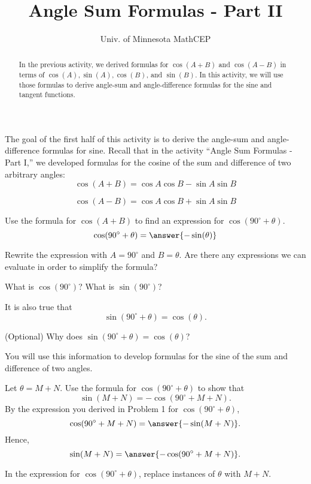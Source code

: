 \documentclass[number]{ximera}
\title{Angle Sum Formulas - Part II}
\author{Univ. of Minnesota MathCEP}
\begin{document}
\begin{abstract}
In the previous activity, we derived formulas for $\cos(A+B)$ and $\cos(A-B)$ in terms of $\cos(A),\sin(A),\cos(B)$, and $\sin(B)$.
In this activity, we will use those formulas to derive angle-sum and angle-difference formulas for the sine and tangent functions.
\end{abstract}

\maketitle

The goal of the first half of this activity is to derive the angle-sum and angle-difference formulas for sine.
Recall that in the activity ``Angle Sum Formulas - Part I,'' we developed formulas for the cosine of the sum and difference of two arbitrary angles:
\[ \cos(A+B) = \cos A \cos B - \sin A \sin B \]

\[ \cos(A-B) = \cos A \cos B + \sin A \sin B \]

\begin{problem}
Use the formula for $\cos(A+B)$ to find an expression for $\cos(90^\circ + \theta)$.
\[\cos(90^\circ + \theta) = \answer{-\sin(\theta)}\]
\begin{hint}
Rewrite the expression with $A=90^\circ$ and $B=\theta$. Are there any expressions we can evaluate in order to simplify the formula?
\end{hint}
\begin{hint}
What is $\cos(90^\circ)$? What is $\sin(90^\circ)$?
\end{hint}

\end{problem}

It is also true that \[\sin(90^\circ+\theta) = \cos(\theta).\]
\begin{question}
(Optional) Why does $\sin(90^\circ+\theta)=\cos(\theta)$?
\begin{freeResponse}

\end{freeResponse}
\end{question}

You will use this information to develop formulas for the sine of the sum and difference of two angles.

\begin{problem}
Let $\theta = M+N$. Use the formula for $\cos(90^\circ+\theta)$ to show that
\[\sin(M+N)=-\cos(90^\circ+M+N).\]
By the expression you derived in Problem 1 for $\cos(90^\circ+\theta)$,
\[\cos(90^\circ+M+N) = \answer{-\sin(M+N)}.\]
Hence,
\[\sin(M+N)=\answer{-\cos(90^\circ+M+N)}.\]
\begin{hint}
In the expression for $\cos(90^\circ+\theta)$, replace instances of $\theta$ with $M+N$.
\end{hint}
\end{problem}
\end{document}

